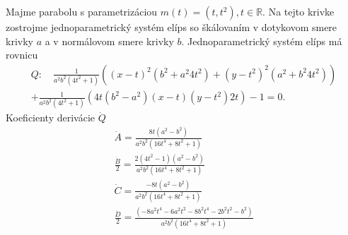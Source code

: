 \begin{example}[Parabola]
Majme parabolu s parametrizáciou $m(t)=(t, t^2), t \in \mathbb{R}.$ Na tejto krivke zostrojme jednoparametrický systém elíps so škálovaním v dotykovom smere krivky $a$ a v normálovom smere krivky $b$. 
Jednoparametrický systém elíps má rovnicu
\begin{gather*}
Q \colon \quad \frac{1}{a^{2} b^{2}\left(4 t^{2} + 1\right)} \left( (x-t)^2 (b^2 + a^{2} 4t^2) + (y-t^2)^2 (a^2 + b^2 4t^2) \right) \\ 
+ \frac{1}{a^{2} b^{2}\left(4 t^{2} + 1\right)} \left( 4t(b^2 - a^2)(x-t)(y-t^2)2t \right) - 1 = 0.
\end{gather*}
Koeficienty derivácie $\dot{Q}$ 
\begin{gather*}
\dot{A}  = \frac{8 t \left(a^{2} - b^{2}\right)}{a^{2} b^{2} \left(16 t^{4} + 8 t^{2} + 1\right)} \\
\frac{\dot{B}}{2} = \frac{2 (4 t^{2} - 1) (a^{2} - b^{2})}{a^{2} b^{2} \left(16 t^{4} + 8 t^{2} + 1\right)} \\
\dot{C} = \frac{-8 t \left(a^{2} - b^{2}\right)}{a^{2} b^{2} \left(16 t^{4} + 8 t^{2} + 1\right)} \\
\frac{\dot{D}}{2} = \frac{ \left(- 8 a^{2} t^{4} - 6 a^{2} t^{2} - 8 b^{2} t^{4} - 2 b^{2} t^{2} - b^{2}\right)}{a^{2} b^{2} \left(16 t^{4} + 8 t^{2} + 1\right)} \\
\end{gather*}

\end{example}
